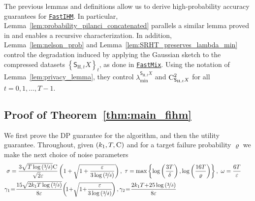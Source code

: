 \documentclass[11pt]{article}
\theoremstyle{definition}
\theoremstyle{plain}
\providecommand{\theoremref}[1]{Theorem~\ref{#1}}
\providecommand{\lemmaref}[1]{Lemma~\ref{#1}}
\newcommand{\eps}{{\varepsilon}}
\renewcommand{\eps}{\varepsilon}
\newcommand{\FastMix}{\hyperref[alg:fast_mixing]{\texttt{FastMix}}\xspace}
\newcommand{\FastIHM}{\hyperref[alg:private_fast_hessian_sketch]{\texttt{FastIHM}}\xspace}
\begin{document}
The previous lemmas and definitions allow us to derive high-probability accuracy guarantees for \FastIHM. In particular, \lemmaref{lem:probability_pilanci_concatenated} parallels a similar lemma proved in \citet{lev2026near} and enables a recursive characterization. In addition, \lemmaref{lem:nelson_prob} and \lemmaref{lem:SRHT_preserves_lambda_min} control the degradation induced by applying the Gaussian sketch to the compressed datasets $\left\{\mathsf{S}_{\mathrm{H}, t}X\right\}_t$, as done in \FastMix. Using the notation of \lemmaref{lem:privacy_lemma}, they control $\lambda^{\mathsf{S}_{\mathrm{H}, t}X}_{\min}$ and $\textsc{C}^2_{\mathsf{S}_{\mathrm{H}, t}X}$ for all $t=0,1,\ldots,T-1$. 

\subsection{\textbf{Proof of \theoremref{thm:main_fihm}}}
\label{app:prf:thm:privacy_utility_fihm}
We first prove the DP guarantee for the algorithm, and then the utility guarantee. Throughout, given $(k_1, T, \textsc{C})$ and for a target failure probability $\varrho$ we make the next choice of noise parameters 
\begin{align}
    \label{eq:parameters_choice_fast_ihm}
    \sigma &= \frac{3\sqrt{T\log\left(\nicefrac{3}{\delta}\right)}\textsc{C}}{\sqrt{2}\eps}\left(1+\sqrt{1+\frac{\eps}{3 \log\left(\nicefrac{3}{\delta}\right)}}\right), \ \tau = \max\left\{\log\left(\frac{3T}{\delta}\right), \log\left(\frac{16T}{\varrho}\right)\right\}, \ \omega = \frac{6T}{\eps}\ \ \ \ \ \\
    \gamma_1 &\hspace{-0.2em}=\hspace{-0.2em} \frac{15\sqrt{2k_1T\log\left(\nicefrac{3}{\delta}\right)}}{8\varepsilon}\hspace{-0.2em}\left(\hspace{-0.2em}1\hspace{-0.2em}+\hspace{-0.2em}\sqrt{1\hspace{-0.2em}+\hspace{-0.2em}\frac{\varepsilon}{3 \log\left(\nicefrac{3}{\delta}\right)}}\hspace{-0.15em}\right), \gamma_2 \hspace{-0.2em}=\hspace{-0.2em} \frac{2k_1T \hspace{-0.2em}+\hspace{-0.2em} 25\log\left(\nicefrac{3}{\delta}\right)}{8\eps}
\end{align}
\end{document}
